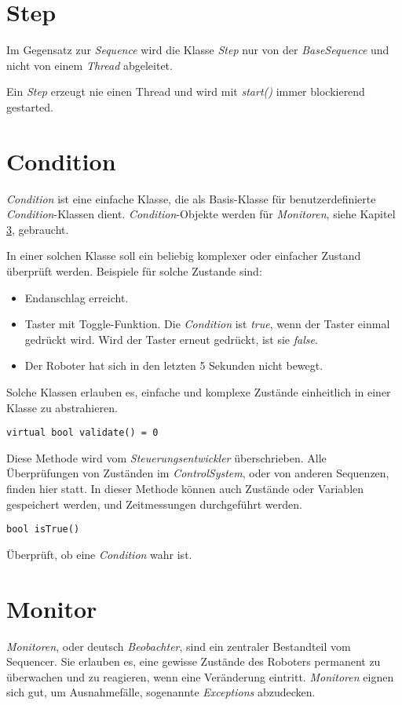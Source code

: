 \section{Step}
Im Gegensatz zur \textit{Sequence} wird die Klasse \textit{Step} nur von der \textit{BaseSequence} und nicht von einem \textit{Thread} abgeleitet.

Ein \textit{Step} erzeugt nie einen Thread und wird mit \textit{start()} immer blockierend gestarted.



\section{Condition}
\label{Condition}
\textit{Condition} ist eine einfache Klasse, die als Basis-Klasse für benutzerdefinierte \textit{Condition}-Klassen dient.
\textit{Condition}-Objekte werden für \textit{Monitoren}, siehe Kapitel \ref{Monitor}, gebraucht.

In einer solchen Klasse soll ein beliebig komplexer oder einfacher Zustand überprüft werden.
Beispiele für solche Zustande sind:
\begin{itemize}
\item Endanschlag erreicht.
\item Taster mit Toggle-Funktion. Die \textit{Condition} ist \textit{true}, wenn der Taster einmal gedrückt wird. Wird der Taster erneut gedrückt, ist sie \textit{false}.
\item Der Roboter hat sich in den letzten 5 Sekunden nicht bewegt.
\end{itemize}

Solche Klassen erlauben es, einfache und komplexe Zustände einheitlich in einer Klasse zu abstrahieren.

\begin{lstlisting}
virtual bool validate() = 0
\end{lstlisting}
Diese Methode wird vom \textit{Steuerungsentwickler} überschrieben.
Alle Überprüfungen von Zuständen im \textit{ControlSystem}, oder von anderen Sequenzen, finden hier statt.
In dieser Methode können auch Zustände oder Variablen gespeichert werden, und Zeitmessungen durchgeführt werden.


\begin{lstlisting}
bool isTrue()
\end{lstlisting}
Überprüft, ob eine \textit{Condition} wahr ist.



\section{Monitor}
\label{Monitor}
\textit{Monitoren}, oder deutsch \textit{Beobachter}, sind ein zentraler Bestandteil vom Sequencer.
Sie erlauben es, eine gewisse Zustände des Roboters permanent zu überwachen und zu reagieren, wenn eine Veränderung eintritt.
\textit{Monitoren} eignen sich gut, um Ausnahmefälle, sogenannte \textit{Exceptions} abzudecken.


